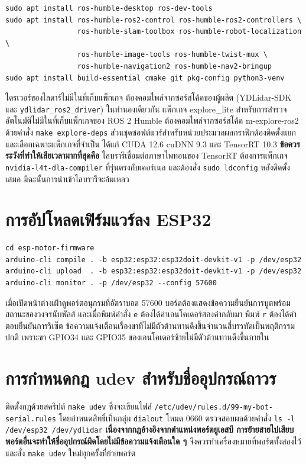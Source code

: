 \documentclass[a4paper,12pt]{report}
\begin{document}
{\small
\begin{verbatim}
sudo apt install ros-humble-desktop ros-dev-tools
sudo apt install ros-humble-ros2-control ros-humble-ros2-controllers \
                 ros-humble-slam-toolbox ros-humble-robot-localization \
                 ros-humble-image-tools ros-humble-twist-mux \
                 ros-humble-navigation2 ros-humble-nav2-bringup
sudo apt install build-essential cmake git pkg-config python3-venv
\end{verbatim}
}

ไดรเวอร์ของไลดาร์ไม่มีในที่เก็บแพ็กเกจ ต้องคอมไพล์จากซอร์สโค้ดของผู้ผลิต
(YDLidar-SDK และ \texttt{ydlidar\_ros2\_driver})
ในทำนองเดียวกัน แพ็กเกจ explore\_lite สำหรับการสำรวจอัตโนมัติไม่มีในที่เก็บแพ็กเกจของ ROS 2 Humble
ต้องคอมไพล์จากซอร์สโค้ด m-explore-ros2 ด้วยคำสั่ง \texttt{make explore-deps}
ส่วนชุดซอฟต์แวร์สำหรับหน่วยประมวลผลกราฟิกต้องติดตั้งแยกและเลือกเฉพาะแพ็กเกจที่จำเป็น
ได้แก่ CUDA 12.6 cuDNN 9.3 และ TensorRT 10.3
\textbf{ข้อควรระวังที่ทำให้เสียเวลามากที่สุดคือ} ไลบรารีเชื่อมต่อภาษาไพทอนของ TensorRT
ต้องการแพ็กเกจ \texttt{nvidia-l4t-dla-compiler} ที่รุ่นตรงกับเคอร์เนล
และต้องสั่ง \texttt{sudo ldconfig} หลังติดตั้งเสมอ มิฉะนั้นการนำเข้าไลบรารีจะล้มเหลว

\section{การอัปโหลดเฟิร์มแวร์ลง ESP32}

{\small
\begin{verbatim}
cd esp-motor-firmware
arduino-cli compile . -b esp32:esp32:esp32doit-devkit-v1 -p /dev/esp32
arduino-cli upload  . -b esp32:esp32:esp32doit-devkit-v1 -p /dev/esp32
arduino-cli monitor . -p /dev/esp32 --config 57600
\end{verbatim}
}

เมื่อเปิดหน้าต่างเฝ้าดูพอร์ตอนุกรมที่อัตราบอด 57600
บอร์ดต้องแสดงข้อความยืนยันการบูตพร้อมสถานะของวงจรนับพัลส์
และเมื่อพิมพ์คำสั่ง \texttt{e} ต้องได้ค่าเอนโคเดอร์สองค่ากลับมา
พิมพ์ \texttt{r} ต้องได้คำตอบยืนยันการรีเซ็ต
ข้อความแจ้งเตือนเรื่องขาที่ไม่มีตัวต้านทานดึงขึ้นจำนวนสี่บรรทัดเป็นพฤติกรรมปกติ
เพราะขา GPIO34 และ GPIO35 ของเอนโคเดอร์ซ้ายไม่มีตัวต้านทานดึงขึ้นภายใน

\section{การกำหนดกฎ udev สำหรับชื่ออุปกรณ์ถาวร}

ติดตั้งกฎด้วยสคริปต์ \texttt{make udev} ซึ่งจะเขียนไฟล์
\texttt{/etc/udev/rules.d/99-my-bot-serial.rules}
โดยกำหนดสิทธิ์เป็นกลุ่ม \texttt{dialout} โหมด 0660
ตรวจสอบผลด้วยคำสั่ง \texttt{ls -l /dev/esp32 /dev/ydlidar}
\textbf{เนื่องจากกฎอ้างอิงจากตำแหน่งพอร์ตยูเอสบี
การย้ายสายไปเสียบพอร์ตอื่นจะทำให้ชื่ออุปกรณ์ผิดโดยไม่มีข้อความแจ้งเตือนใด ๆ}
จึงควรทำเครื่องหมายที่พอร์ตทั้งสองไว้ และสั่ง \texttt{make udev} ใหม่ทุกครั้งที่ย้ายพอร์ต
\end{document}
